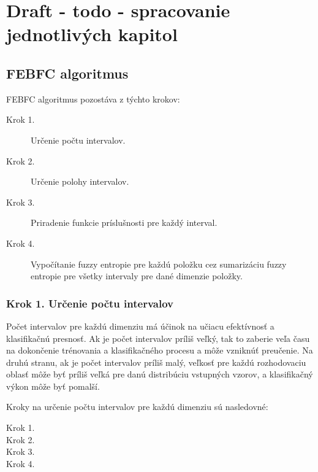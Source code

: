 \chapter{Draft - todo - spracovanie jednotlivých kapitol} 

\section*{FEBFC algoritmus}
FEBFC algoritmus pozostáva z týchto krokov: 
\begin{description}
	\item[Krok 1.] Určenie počtu intervalov. 	
	\item[Krok 2.] Určenie polohy intervalov. 
	\item[Krok 3.] Priradenie funkcie príslušnosti pre každý interval.   
	\item[Krok 4.] Vypočítanie fuzzy entropie pre každú položku cez sumarizáciu fuzzy entropie pre všetky intervaly pre dané dimenzie položky.   
\end{description}


\subsection*{Krok 1. Určenie počtu intervalov }
Počet intervalov pre každú dimenziu má účinok na učiacu efektívnosť a klasifikačnú presnosť. Ak je počet intervalov príliš veľký, tak to zaberie veľa času na dokončenie trénovania a klasifikačného procesu a môže vzniknúť preučenie. Na druhú stranu, ak je počet intervalov príliš malý, veľkosť pre každú rozhodovaciu oblasť môže byť príliš veľká pre danú distribúciu vstupných vzorov, a klasifikačný výkon môže byť pomalší. 
 


Kroky na určenie počtu intervalov pre každú dimenziu sú nasledovné: 
\begin{description}
	\item[Krok 1.]  	
	\item[Krok 2.] 
	\item[Krok 3.] 
	\item[Krok 4.]   
\end{description}